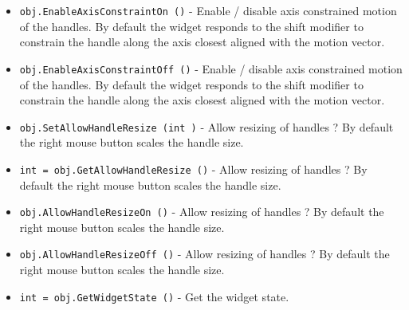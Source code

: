 \begin{itemize}
\item  \verb|obj.EnableAxisConstraintOn ()| -  Enable / disable axis constrained motion of the handles. By default the
 widget responds to the shift modifier to constrain the handle along the
 axis closest aligned with the motion vector.

\item  \verb|obj.EnableAxisConstraintOff ()| -  Enable / disable axis constrained motion of the handles. By default the
 widget responds to the shift modifier to constrain the handle along the
 axis closest aligned with the motion vector.

\item  \verb|obj.SetAllowHandleResize (int )| -  Allow resizing of handles ? By default the right mouse button scales
 the handle size.

\item  \verb|int = obj.GetAllowHandleResize ()| -  Allow resizing of handles ? By default the right mouse button scales
 the handle size.

\item  \verb|obj.AllowHandleResizeOn ()| -  Allow resizing of handles ? By default the right mouse button scales
 the handle size.

\item  \verb|obj.AllowHandleResizeOff ()| -  Allow resizing of handles ? By default the right mouse button scales
 the handle size.

\item  \verb|int = obj.GetWidgetState ()| -  Get the widget state.

\end{itemize}
